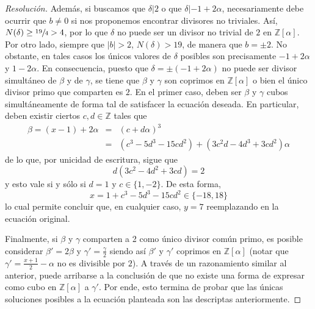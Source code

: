 \documentclass[a4paper,11pt]{article}
\newcommand{\Zm}[1]{\ensuremath{\mathbb{Z}[#1]}}
\newcommand{\Div}[2]{\ensuremath{#1 | #2}}
\begin{document}
\begin{proof}[Resoluci\'on]
Además, si buscamos que $\Div{\delta}{2}$ o que \Div{\delta}{-1 + 2\alpha}, necesariamente debe ocurrir 
que $b \neq 0$ si nos proponemos encontrar divisores no triviales.
Así, $N(\delta) \geq \sfrac{19}{4} > 4$, por lo que $\delta$ no puede ser un divisor no trivial de $2$
en \Zm{\alpha}. Por otro lado, siempre que $|b| > 2$, $N(\delta) > 19$, de manera que $b = \pm 2$.
No obstante, en tales casos los únicos valores de $\delta$
posibles son precisamente $-1 + 2\alpha$ y $1 - 2\alpha$. En consecuencia, puesto que 
$\delta = \pm (-1 + 2\alpha)$ no puede ser divisor simultáneo de $\beta$ y de $\gamma$,
se tiene que $\beta$ y $\gamma$ son coprimos en \Zm{\alpha} o bien el único divisor primo que comparten
es $2$. En el primer caso, deben ser $\beta$ y $\gamma$ cubos simultáneamente de forma tal de satisfacer
la ecuación deseada. En particular, deben existir ciertos $c, d \in \mathbb{Z}$ tales que
\begin{eqnarray*}
    \beta = (x-1) + 2\alpha &=& (c + d \alpha)^3 \\
          &=& \left(c^3 - 5d^3 - 15cd^2 \right) + \left(3c^2d - 4d^3 + 3cd^2 \right) \alpha
\end{eqnarray*}
de lo que, por unicidad de escritura, sigue que
$$d (3c^2 - 4d^2 + 3cd) = 2$$
y esto vale si y sólo si $d = 1$ y $c \in \{1, -2\}$. De esta forma, 
$$x = 1 + c^3 - 5d^3 - 15cd^2 \in \{-18, 18\}$$
lo cual permite concluir que, en cualquier caso, $y = 7$ reemplazando en la ecuación original.

Finalmente, si $\beta$ y $\gamma$ comparten a 2 como único divisor común primo, es posible considerar
$\beta'= 2\beta$ y $\gamma' = \frac{\gamma}{2}$ siendo así $\beta'$ y $\gamma'$ coprimos en \Zm{\alpha}
(notar que $\gamma' = \frac{x+1}{2} - \alpha$ no es divisible por $2$).
A través de un razonamiento similar al anterior, puede arribarse a la conclusión de que no existe una
forma de expresar como cubo en \Zm{\alpha} a $\gamma'$. Por ende, esto termina de probar que las 
únicas soluciones posibles a la ecuación planteada son las descriptas anteriormente.
\end{proof}
\end{document}
